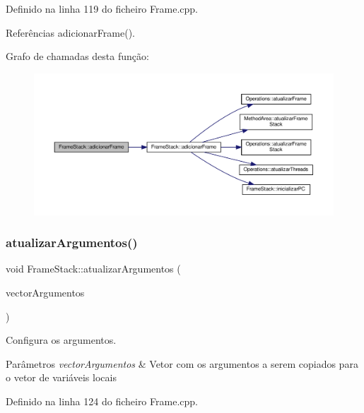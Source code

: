 Definido na linha 119 do ficheiro Frame.\+cpp.



Referências adicionar\+Frame().

Grafo de chamadas desta função\+:
\nopagebreak
\begin{figure}[H]
\begin{center}
\leavevmode
\includegraphics[width=350pt]{classFrameStack_a7bb4b64eece0c146fc647636397c572c_cgraph}
\end{center}
\end{figure}
\mbox{\label{classFrameStack_a9e7308944f41d892a5a01566d85cad8f}} 
\subsubsection{\texorpdfstring{atualizar\+Argumentos()}{atualizarArgumentos()}}
{\footnotesize\ttfamily void Frame\+Stack\+::atualizar\+Argumentos (\begin{DoxyParamCaption}\item[{vector$<$ \hyperlink{BasicTypes_8h_a97b332303b1262282599e6ede0637b82}{Typed\+Element} $>$}]{vector\+Argumentos }\end{DoxyParamCaption})}



Configura os argumentos. 


\begin{DoxyParams}{Parâmetros}
{\em vector\+Argumentos} & Vetor com os argumentos a serem copiados para o vetor de variáveis locais \\
\hline
\end{DoxyParams}


Definido na linha 124 do ficheiro Frame.\+cpp.



